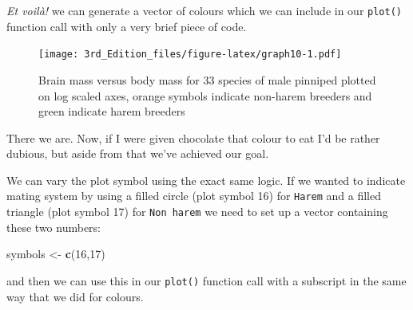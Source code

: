 \documentclass[
]{book}
\newenvironment{Shaded}{\begin{snugshade}}{\end{snugshade}}
\newcommand{\DataTypeTok}[1]{\textcolor[rgb]{0.13,0.29,0.53}{#1}}
\newcommand{\DecValTok}[1]{\textcolor[rgb]{0.00,0.00,0.81}{#1}}
\newcommand{\KeywordTok}[1]{\textcolor[rgb]{0.13,0.29,0.53}{\textbf{#1}}}
\newcommand{\NormalTok}[1]{#1}
\newcommand{\OperatorTok}[1]{\textcolor[rgb]{0.81,0.36,0.00}{\textbf{#1}}}
\newcommand{\StringTok}[1]{\textcolor[rgb]{0.31,0.60,0.02}{#1}}
\begin{document}
\emph{Et voilà!} we can generate a vector of colours which we can include in our \texttt{plot()} function call with only a very brief piece of code.

\begin{Shaded}
\end{Shaded}

\begin{figure}
\centering
\texttt{[image: 3rd\_Edition\_files/figure-latex/graph10-1.pdf]}
\caption{\label{fig:graph10}Brain mass versus body mass for 33 species of male pinniped plotted on log scaled axes, orange symbols indicate non-harem breeders and green indicate harem breeders}
\end{figure}

There we are. Now, if I were given chocolate that colour to eat I'd be rather dubious, but aside from that we've achieved our goal.

We can vary the plot symbol using the exact same logic. If we wanted to indicate mating system by using a filled circle (plot symbol 16) for \texttt{Harem} and a filled triangle (plot symbol 17) for \texttt{Non\ harem} we need to set up a vector containing these two numbers:

\begin{Shaded}
\begin{Highlighting}[]
\NormalTok{symbols <-}\StringTok{ }\KeywordTok{c}\NormalTok{(}\DecValTok{16}\NormalTok{,}\DecValTok{17}\NormalTok{)}
\end{Highlighting}
\end{Shaded}

and then we can use this in our \texttt{plot()} function call with a subscript in the same way that we did for colours.

\begin{Shaded}
\end{Shaded}
\end{document}
